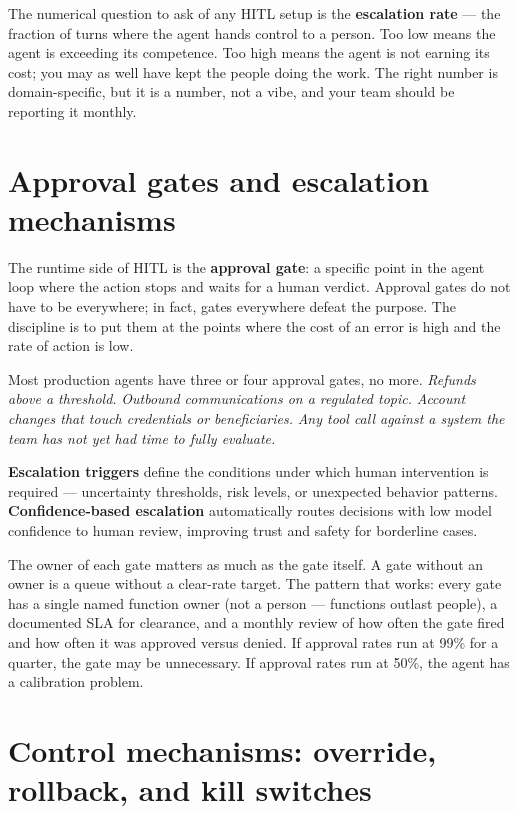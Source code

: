 The numerical question to ask of any HITL setup is the \textbf{escalation rate} --- the fraction of turns where the agent hands control to a person. Too low means the agent is exceeding its competence. Too high means the agent is not earning its cost; you may as well have kept the people doing the work. The right number is domain-specific, but it is a number, not a vibe, and your team should be reporting it monthly.

\section{Approval gates and escalation mechanisms}

The runtime side of HITL is the \textbf{approval gate}: a specific point in the agent loop where the action stops and waits for a human verdict. Approval gates do not have to be everywhere; in fact, gates everywhere defeat the purpose. The discipline is to put them at the points where the cost of an error is high and the rate of action is low.

Most production agents have three or four approval gates, no more. \textit{Refunds above a threshold.} \textit{Outbound communications on a regulated topic.} \textit{Account changes that touch credentials or beneficiaries.} \textit{Any tool call against a system the team has not yet had time to fully evaluate.}

\textbf{Escalation triggers} define the conditions under which human intervention is required --- uncertainty thresholds, risk levels, or unexpected behavior patterns. \textbf{Confidence-based escalation} automatically routes decisions with low model confidence to human review, improving trust and safety for borderline cases.

The owner of each gate matters as much as the gate itself. A gate without an owner is a queue without a clear-rate target. The pattern that works: every gate has a single named function owner (not a person --- functions outlast people), a documented SLA for clearance, and a monthly review of how often the gate fired and how often it was approved versus denied. If approval rates run at 99\% for a quarter, the gate may be unnecessary. If approval rates run at 50\%, the agent has a calibration problem.

\section{Control mechanisms: override, rollback, and kill switches}

